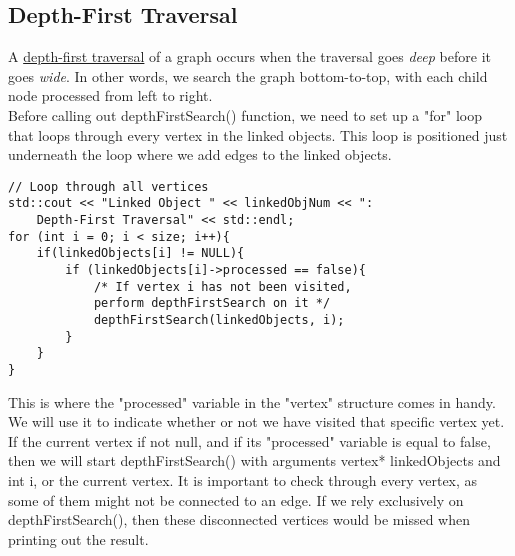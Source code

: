 \documentclass{article}
\begin{document}
\pagebreak

\subsection{Depth-First Traversal}
A \underline{depth-first traversal} of a graph occurs when the traversal goes \textit{deep} before it goes \textit{wide}. In other words, we search the graph bottom-to-top, with each child node processed from left to right. \\
Before calling out depthFirstSearch() function, we need to set up a "for" loop that loops through every vertex in the linked objects. This loop is positioned just underneath the loop where we add edges to the linked objects. 
\begin{lstlisting}
// Loop through all vertices
std::cout << "Linked Object " << linkedObjNum << ": 
    Depth-First Traversal" << std::endl;
for (int i = 0; i < size; i++){
    if(linkedObjects[i] != NULL){
        if (linkedObjects[i]->processed == false){
            /* If vertex i has not been visited, 
            perform depthFirstSearch on it */
            depthFirstSearch(linkedObjects, i);
        }
    }
}
\end{lstlisting}
This is where the "processed" variable in the "vertex" structure comes in handy. We will use it to indicate whether or not we have visited that specific vertex yet. If the current vertex if not null, and if its "processed" variable is equal to false, then we will start depthFirstSearch() with arguments vertex* linkedObjects and int i, or the current vertex. It is important to check through every vertex, as some of them might not be connected to an edge. If we rely exclusively on depthFirstSearch(), then these disconnected vertices would be missed when printing out the result.
\end{document}
